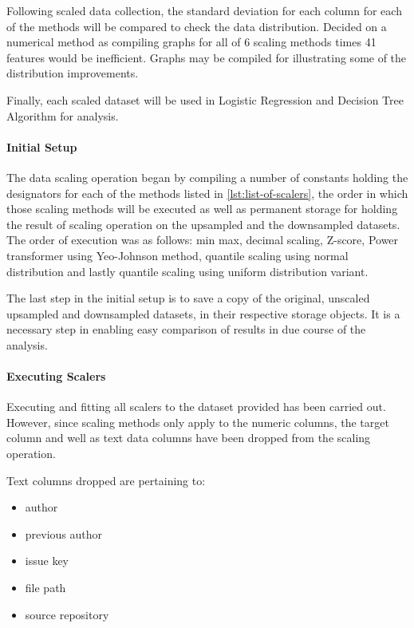 Following scaled data collection, the standard deviation for each column for each of the methods will be compared to check the data distribution. Decided on a numerical method as compiling graphs for all of 6 scaling methods times 41 features would be inefficient. Graphs may be compiled for illustrating some of the distribution improvements.

Finally, each scaled dataset will be used in Logistic Regression and Decision Tree Algorithm for analysis.

\paragraph{Initial Setup}\label{sec:scalers:initial-setup}
The data scaling operation began by compiling a number of constants holding the designators for each of the methods listed in \ref{lst:list-of-scalers}, the order in which those scaling methods will be executed as well as permanent storage for holding the result of scaling operation on the upsampled and the downsampled datasets.
The order of execution was as follows: min max, decimal scaling, Z-score, Power transformer using Yeo-Johnson method, quantile scaling using normal distribution and lastly quantile scaling using uniform distribution variant.

The last step in the initial setup is to save a copy of the original, unscaled upsampled and downsampled datasets, in their respective storage objects. It is a necessary step in enabling easy comparison of results in due course of the analysis.

\paragraph{Executing Scalers}
Executing and fitting all scalers to the dataset provided has been carried out. However, since scaling methods only apply to the numeric columns, the target column and well as text data columns have been dropped from the scaling operation.

Text columns dropped are pertaining to:
\begin{itemize}
    \item author
    \item previous author
    \item issue key
    \item file path
    \item source repository
\end{itemize}

